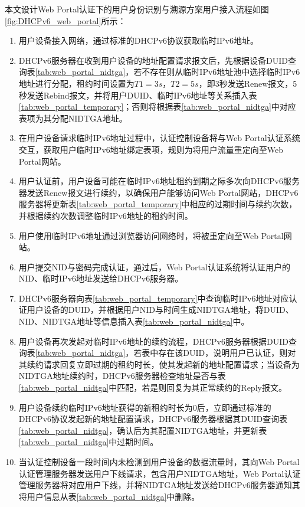     本文设计Web Portal认证下的用户身份识别与溯源方案用户接入流程如图\ref{fig:DHCPv6_web_portal}所示：
    \begin{enumerate}[1{)}]
      \item 用户设备接入网络，通过标准的DHCPv6协议获取临时IPv6地址。
      \item DHCPv6服务器在收到用户设备的地址配置请求报文后，先根据设备DUID查询表\ref{tab:web_portal_nidtga}，若不存在则从临时IPv6地址池中选择临时IPv6地址进行分配，租约时间设置为$T1=3s$，$T2=5s$，即3秒发送Renew报文，5秒发送Rebind报文，并将用户DUID、临时IPv6地址等关系插入表\ref{tab:web_portal_temporary}；否则将根据表\ref{tab:web_portal_nidtga}中对应表项为其分配NIDTGA地址。
      \item 在用户设备请求临时IPv6地址过程中，认证控制设备将与Web Portal认证系统交互，获取用户临时IPv6地址绑定表项，规则为将用户流量重定向至Web Portal网站。
      \item 用户认证前，用户设备可能在临时IPv6地址租约到期之际多次向DHCPv6服务器发送Renew报文进行续约，以确保用户能够访问Web Portal网站，DHCPv6服务器将更新表\ref{tab:web_portal_temporary}中相应的过期时间与续约次数，并根据续约次数调整临时IPv6地址的租约时间。
      \item 用户使用临时IPv6地址通过浏览器访问网络时，将被重定向至Web Portal网站。
      \item 用户提交NID与密码完成认证，通过后，Web Portal认证系统将认证用户的NID、临时IPv6地址发送给DHCPv6服务器。
      \item DHCPv6服务器向表\ref{tab:web_portal_temporary}中查询临时IPv6地址对应认证用户设备的DUID，并根据用户NID与时间生成NIDTGA地址，将DUID、NID、NIDTGA地址等信息插入表\ref{tab:web_portal_nidtga}中。
      \item 用户设备再次发起对临时IPv6地址的续约流程，DHCPv6服务器根据DUID查询表\ref{tab:web_portal_nidtga}，若表中存在该DUID，说明用户已认证，则对其续约请求回复立即过期的租约时长，使其发起新的地址配置请求；当设备为NIDTGA地址续约时，DHCPv6服务器检查地址是否与表\ref{tab:web_portal_nidtga}中匹配，若是则回复为其正常续约的Reply报文。
      \item 用户设备续约临时IPv6地址获得的新租约时长为0后，立即通过标准的DHCPv6协议发起新的地址配置请求，DHCPv6服务器根据其DUID查询表\ref{tab:web_portal_nidtga}，确认后为其配置NIDTGA地址，并更新表\ref{tab:web_portal_nidtga}中过期时间。
      \item 当认证控制设备一段时间内未检测到用户设备的数据流量时，其向Web Portal认证管理服务器发送用户下线请求，包含用户NIDTGA地址，Web Portal认证管理服务器将对应用户下线，并将NIDTGA地址发送给DHCPv6服务器通知其将用户信息从表\ref{tab:web_portal_nidtga}中删除。
    \end{enumerate}
          
